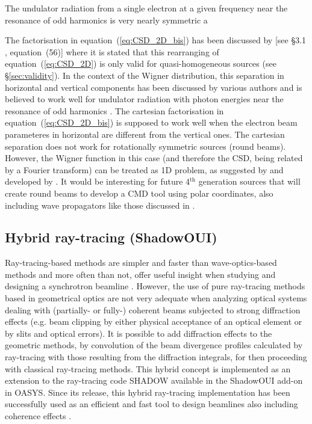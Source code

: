 \documentclass{iucr}              %
\newcommand{\inblue}[1]{{\color{blue}#1}}
\begin{document}
The undulator radiation from a single
electron at a given frequency near the resonance of odd
harmonics is very nearly symmetric a

\inblue{
The factorisation in equation~(\ref{eq:CSD_2D_bis}) has been discussed by \citeasnoun{geloni2008} [see §3.1 , equation~(56)] where it is stated that this rearranging of equation~(\ref{eq:CSD_2D}) is only valid for quasi-homogeneous sources (see \S\ref{sec:validity}). In the context of the Wigner distribution, this separation in horizontal and vertical components has been discussed by various authors and is believed to work well for undulator radiation with photon energies near the resonance of odd
harmonics \cite{Bazarov2012,tanaka2014,nash2021}. 
The cartesian factorisation in equation~(\ref{eq:CSD_2D_bis}) is supposed to work well when the electron beam parameteres in horizontal are different from the vertical ones. The cartesian separation does not work for rotationally symmetric sources (round beams). However, the Wigner function in this case (and therefore the CSD, being related by a Fourier transform) can be treated as 1D problem, as suggested by \citeasnoun{Agarwal2000} and developed by \cite{Gasbarro2014}. It would be interesting for future 4$^\text{th}$ generation sources that will create round beams to develop a CMD tool using polar coordinates, also including wave propagators like those discussed in \cite{LiJacobsen}. 
}


\subsection{Hybrid ray-tracing (ShadowOUI)}

Ray-tracing-based methods are simpler and faster than wave-optics-based methods and more often than not, offer useful insight when studying and designing a synchrotron beamline \cite{hierarchical}. However, the use of pure ray-tracing methods based in geometrical optics are not very adequate when analyzing optical systems dealing with (partially- or fully-) coherent beams subjected to strong diffraction effects (e.g. beam clipping by either physical acceptance of an optical element or by slits and optical errors). It is possible to add diffraction effects to the geometric methods, by convolution of the beam divergence profiles calculated by ray-tracing with those resulting from the diffraction integrals, for then proceeding with classical ray-tracing methods. This hybrid concept \cite{codeHYBRID} is implemented as an extension to the ray-tracing code SHADOW \cite{codeSHADOW} available in the ShadowOUI \cite{codeSHADOWOUI} add-on in OASYS. Since its release, this hybrid ray-tracing implementation has been successfully used as an efficient and fast tool to design beamlines also including coherence effects \cite{Shi2017,Luca2020, Lordano2022}.
\end{document}
